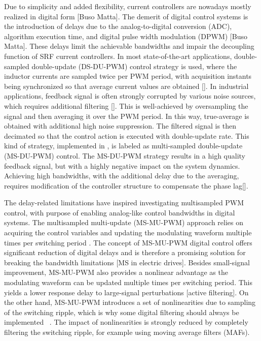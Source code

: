 \documentclass[journal]{IEEEtran}
\begin{document}
Due to simplicity and added flexibility, current controllers are nowadays mostly realized in digital form [Buso Matta]. The demerit of digital control systems is the introduction of delays due to the analog-to-digital conversion (ADC), algorithm execution time, and digital pulse width modulation (DPWM) [Buso Matta]. These delays limit the achievable bandwidths and impair the decoupling function of SRF current controllers. 
In most state-of-the-art applications, double-sampled double-update (DS-DU-PWM) control strategy is used, where the inductor currents are sampled twice per PWM period, with acquisition instants being synchronized so that average current values are obtained []. In industrial applications, feedback signal is often strongly corrupted by various noise sources, which requires additional filtering []. This is well-achieved by oversampling the signal and then averaging it over the PWM period. In this way, true-average is obtained with additional high noise suppression. The filtered signal is then decimated so that the control action is executed with double-update rate. This kind of strategy, implemented in \cite{vuksa2016}, is labeled as multi-sampled double-update (MS-DU-PWM) control. The MS-DU-PWM strategy results in a high quality feedback signal, but with a highly negative impact on the system dynamics. Achieving high bandwidths, with the additional delay due to the averaging, requires modification of the controller structure to compensate the phase lag[].

The delay-related limitations have inspired investigating multisampled PWM control, with purpose of enabling analog-like control bandwidths in digital systems. The multisampled multi-update (MS-MU-PWM) approach relies on acquiring the control variables and updating the modulating waveform multiple times per switching period \cite{corradini_analysis}. The concept of MS-MU-PWM digital control offers significant reduction of digital delays and is therefore a promising solution for breaking the bandwidth limitations \cite{corradini2018} [MS in electric drives]. Besides small-signal improvement, MS-MU-PWM also provides a nonlinear advantage as the modulating waveform can be updated multiple times per switching period. This yields a lower response delay to large-signal perturbations [active filtering]. On the other hand, MS-MU-PWM introduces a set of nonlinearities due to sampling of the switching ripple, which is why some digital filtering should always be implemented ~\cite{petric2020,petric2021}. The impact of nonlinearities is strongly reduced by completely filtering the switching ripple, for example using moving average filters (MAFs).
\end{document}
